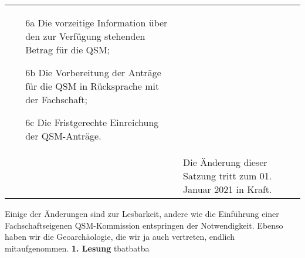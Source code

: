 {\begin{longtable}{|p{7.5cm}|p{7.5cm}|}
\begin{itemize}
        \item[6a] Die vorzeitige Information über den zur Verfügung stehenden Betrag für die QSM;
        \item[6b]Die Vorbereitung der Anträge für die QSM in Rücksprache mit der Fachschaft;
        \item[6c]   Die Fristgerechte Einreichung der QSM-Anträge.
        \end{itemize}\\
        & Die Änderung dieser Satzung tritt zum 01. Januar 2021 in Kraft.\\
    \end{longtable}
}{
    Einige der Änderungen sind zur Lesbarkeit, andere wie die Einführung einer Fachschaftseigenen QSM-Kommission entspringen der Notwendigkeit. Ebenso haben wir die Geoarchäologie, die wir ja auch vertreten, endlich mitaufgenommen.
}{
    \textbf{1. Lesung}
}{tba}{tba}{tba}

